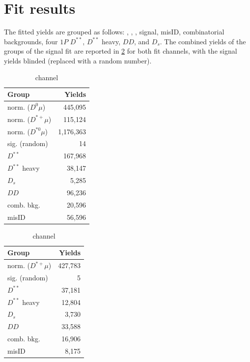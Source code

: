 \section{Fit results}
\label{ref:fit:results}

The fitted yields are grouped as follows:
\Dz\muon, \Dstarp\muon, \Dstarz\muon,
signal,
misID,
combinatorial backgrounds,
four $1P$ $D^{**}$,
$D^{**}$ heavy,
$DD$,
and $D_s$.
The combined yields of the groups of the signal fit are reported in
\cref{tab:fit-yields} for both fit channels,
with the signal yields blinded (replaced with a random number).

\begin{table}[!ht]
    \centering
    \caption{Fitted yields of the signal fit.}
    \label{tab:fit-yields}

\begin{subtable}[b]{0.5\textwidth}
    \centering

\begin{tabular}[b]{lr}
\hline
 Group               &    Yields \\
\hline
 norm. ($D^0\mu$)    &   445,095 \\
 norm. ($D^{*+}\mu$) &   115,124 \\
 norm. ($D^{*0}\mu$) & 1,176,363 \\
 sig. (random)       &        14 \\
 $D^{**}$            &   167,968 \\
 $D^{**}$ heavy      &    38,147 \\
 $D_s$               &     5,285 \\
 $DD$                &    96,236 \\
 comb. bkg.          &    20,596 \\
 misID               &    56,596 \\
\hline
\end{tabular}

    \caption{\Dz channel}
\end{subtable}%
\begin{subtable}[b]{0.5\textwidth}
    \centering

\begin{tabular}[b]{lr}
\hline
 Group               &   Yields \\
\hline
 norm. ($D^{*+}\mu$) &  427,783 \\
 sig. (random)       &        5 \\
 $D^{**}$            &   37,181 \\
 $D^{**}$ heavy      &   12,804 \\
 $D_s$               &    3,730 \\
 $DD$                &   33,588 \\
 comb. bkg.          &   16,906 \\
 misID               &    8,175 \\
\hline
\end{tabular}

    \caption{\Dstar channel}
\end{subtable}

\end{table}


